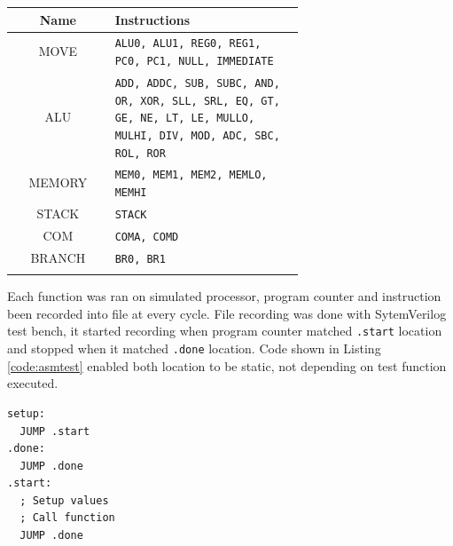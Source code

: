 \begin{blockpage}
	\begin{tabular}{| c | p{0.65\linewidth} |} \hline 
		\rowcolor[rgb]{0.82,0.82,0.82}
		Name & Instructions \\\hline	
		\arrayrulecolor[rgb]{0.82,0.82,0.82}	
		MOVE & \texttt{ALU0, ALU1, REG0, REG1, PC0, PC1, NULL, IMMEDIATE} \\\hline
		ALU & \texttt{ADD, ADDC, SUB, SUBC,
		AND, OR, XOR, SLL,
		SRL, EQ, GT, GE, NE,
		LT, LE, MULLO, MULHI, DIV, MOD,
		ADC, SBC, ROL, ROR} \\\hline
		MEMORY & \texttt{MEM0, MEM1, MEM2, MEMLO, MEMHI} \\\hline
		STACK  & \texttt{STACK} \\\hline
		COM & \texttt{COMA, COMD} \\\hline
		BRANCH & \texttt{BR0, BR1} \\\hline
		\arrayrulecolor[rgb]{0,0,0}\hline
	\end{tabular}
	\label{tab:instr_groups_oisc_src}
\end{blockpage}

Each function was ran on simulated processor, program counter and instruction been recorded into file at every cycle. File recording was done with SytemVerilog test bench, it started recording when program counter matched \texttt{.start} location and stopped when it matched \texttt{.done} location. Code shown in Listing \ref{code:asmtest} enabled both location to be static, not depending on test function executed.

\begin{blockpage}
	\begin{lstlisting}[frame=single, caption={Assembly frame for executring tests}, emph={setup,start,done}, label={code:asmtest}]
setup:
  JUMP .start
.done:
  JUMP .done
.start:
  ; Setup values
  ; Call function
  JUMP .done
	\end{lstlisting}
\end{blockpage}


